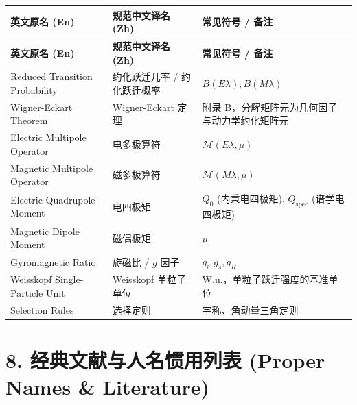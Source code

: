 \begin{longtable}{p{4.8cm} p{4.8cm} p{5.0cm}}
\toprule
\textbf{英文原名 (En)} & \textbf{规范中文译名 (Zh)} & \textbf{常见符号 / 备注} \tabularnewline
\midrule
\endfirsthead
\toprule
\textbf{英文原名 (En)} & \textbf{规范中文译名 (Zh)} & \textbf{常见符号 / 备注} \tabularnewline
\midrule
\endhead
\bottomrule
\endfoot
\bottomrule
\endlastfoot
Reduced Transition Probability & 约化跃迁几率 / 约化跃迁概率 & $B(E\lambda), B(M\lambda)$ \tabularnewline
Wigner-Eckart Theorem & Wigner-Eckart 定理 & 附录 B，分解矩阵元为几何因子与动力学约化矩阵元 \tabularnewline
Electric Multipole Operator & 电多极算符 & $\mathcal{M}(E\lambda, \mu)$ \tabularnewline
Magnetic Multipole Operator & 磁多极算符 & $\mathcal{M}(M\lambda, \mu)$ \tabularnewline
Electric Quadrupole Moment & 电四极矩 & $Q_0$ (内秉电四极矩), $Q_{\text{spec}}$ (谱学电四极矩) \tabularnewline
Magnetic Dipole Moment & 磁偶极矩 & $\mu$ \tabularnewline
Gyromagnetic Ratio & 旋磁比 / $g$ 因子 & $g_l, g_s, g_R$ \tabularnewline
Weisskopf Single-Particle Unit & Weisskopf 单粒子单位 & W.u.，单粒子跃迁强度的基准单位 \tabularnewline
Selection Rules & 选择定则 & 宇称、角动量三角定则 \tabularnewline
\end{longtable}

\section*{8. 经典文献与人名惯用列表 (Proper Names \& Literature)}

